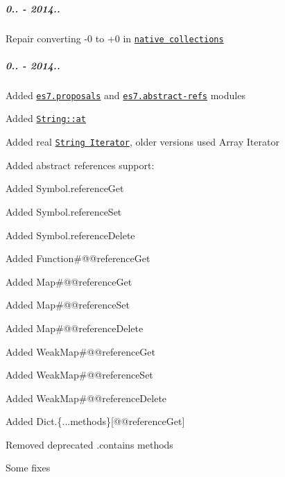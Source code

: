 \subparagraph*{0.. -\/ 2014..}


\begin{DoxyItemize}
\item Repair converting -\/0 to +0 in \href{https://github.com/zloirock/core-js/#ecmascript-6-collections}{\tt native collections}
\end{DoxyItemize}

\subparagraph*{0.. -\/ 2014..}


\begin{DoxyItemize}
\item Added \href{https://github.com/zloirock/core-js/#ecmascript-7-proposals}{\tt {\ttfamily es7.\+proposals}} and \href{https://github.com/zenparsing/es-abstract-refs}{\tt {\ttfamily es7.\+abstract-\/refs}} modules
\item Added \href{https://github.com/zloirock/core-js/#ecmascript-7-proposals}{\tt {\ttfamily String\+::at}}
\item Added real \href{https://github.com/zloirock/core-js/#ecmascript-6-iterators}{\tt {\ttfamily String Iterator}}, older versions used Array Iterator
\item Added abstract references support\+:
\begin{DoxyItemize}
\item Added {\ttfamily Symbol.\+reference\+Get}
\item Added {\ttfamily Symbol.\+reference\+Set}
\item Added {\ttfamily Symbol.\+reference\+Delete}
\item Added {\ttfamily Function\#@@reference\+Get}
\item Added {\ttfamily Map\#@@reference\+Get}
\item Added {\ttfamily Map\#@@reference\+Set}
\item Added {\ttfamily Map\#@@reference\+Delete}
\item Added {\ttfamily Weak\+Map\#@@reference\+Get}
\item Added {\ttfamily Weak\+Map\#@@reference\+Set}
\item Added {\ttfamily Weak\+Map\#@@reference\+Delete}
\item Added {\ttfamily Dict.\{...methods\}\mbox{[}@@reference\+Get\mbox{]}}
\end{DoxyItemize}
\item Removed deprecated {\ttfamily .contains} methods
\item Some fixes
\end{DoxyItemize}

